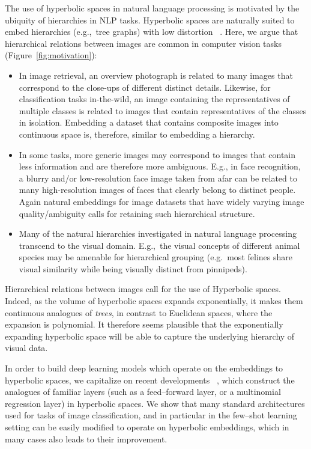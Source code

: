 \documentclass[10pt,twocolumn,letterpaper]{article}
\newcommand{\fig}[1]{Figure~\ref{fig:#1}}
\begin{document}
The use of hyperbolic spaces in natural language processing \cite{nickel2017poincare,tifrea2018poincar,dhingra2018embedding} is motivated by the ubiquity of hierarchies in NLP tasks. Hyperbolic spaces are naturally suited to embed hierarchies (e.g.,\ tree graphs) with low distortion ~\cite{sarkar2011low,sala2018representation}. Here, we argue that hierarchical relations between images are common in computer vision tasks (\fig{motivation}):
\begin{itemize}
\item In image retrieval, an overview photograph is related to many images that correspond to the close-ups of different distinct details. Likewise, for classification tasks in-the-wild, an image containing the representatives of multiple classes is related to images that contain representatives of the classes in isolation. Embedding a dataset that contains composite images into continuous space is, therefore, similar to embedding a hierarchy.
\item In some tasks, more generic images may correspond to images that contain less information and are therefore more ambiguous. E.g., in face recognition, a blurry and/or low-resolution face image taken from afar can be related to many high-resolution images of faces that clearly belong to distinct people. Again natural embeddings for image datasets that have widely varying image quality/ambiguity calls for retaining such hierarchical structure.
\item Many of the natural hierarchies investigated in natural language processing transcend to the visual domain. E.g.,\ the visual concepts of different animal species may be amenable for hierarchical grouping (e.g.~most felines share visual similarity while being visually distinct from pinnipeds).
\end{itemize}

Hierarchical relations between images call for the use of Hyperbolic spaces. Indeed, as the volume of hyperbolic spaces expands exponentially, it makes them continuous analogues of \emph{trees}, in contrast to Euclidean spaces, where the expansion is polynomial. It therefore seems plausible that the exponentially expanding hyperbolic space will be able to capture the underlying hierarchy of visual data. 

In order to build deep learning models which operate on the embeddings to hyperbolic spaces, we capitalize on recent developments ~\cite{ganea2018hyperbolic}, which construct the analogues of familiar layers (such as a feed--forward layer, or a multinomial regression layer) in hyperbolic spaces. We show that many standard architectures used for tasks of image classification, and in particular in the few--shot learning setting can be easily modified to operate on hyperbolic embeddings, which in many cases also leads to their improvement.
\end{document}
